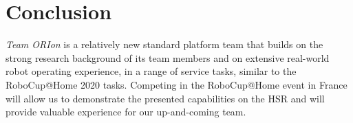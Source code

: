 \documentclass[runningheads,a4paper]{llncs}
\newcommand{\robospecs}{%
  \newpage%
  \pagenumbering{gobble}%
}
\newcommand{\teamori}{Team ORIon}
\begin{document}

\section{Conclusion}
\textit{\teamori{}} is a relatively new standard platform team that builds on the strong research 
background of its team members and on extensive real-world robot operating
experience, in a range of service tasks, similar to the RoboCup@Home 2020 tasks. 
Competing in the RoboCup@Home event in France will allow us to demonstrate the presented capabilities on the HSR and will provide valuable experience for our up-and-coming team.





\robospecs

\end{document}

